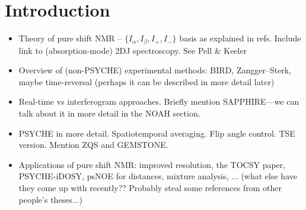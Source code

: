 \section{Introduction}
\label{sec:pureshift__introduction}

\begin{itemize}
    \item Theory of pure shift NMR -- $\{I_\alpha, I_\beta, I_+, I_-\}$ basis as explained in refs\autocite{Keeler2010,Thrippleton2005JMR,Griesinger1986JCP}.
        Include link to (absorption-mode) 2DJ spectroscopy.\autocite{Aue1976JCP} See Pell \& Keeler\autocite{Pell2007JMR}
    \item Overview of (non-PSYCHE) experimental methods: BIRD, Zangger--Sterk\autocite{Zangger1997JMR}, maybe time-reversal (perhaps it can be described in more detail later)
    \item Real-time vs interferogram approaches. Briefly mention SAPPHIRE\autocite{Moutzouri2017CC}---we can talk about it in more detail in the NOAH section.
    \item PSYCHE\autocite{Foroozandeh2014ACIE,Foroozandeh2018CEJ} in more detail.
        Spatiotemporal averaging.\autocite{Dumez2018PNMRS}
        Flip angle control.
        TSE version\autocite{Foroozandeh2015CC}.
        Mention ZQS\autocite{Thrippleton2003ACIE} and GEMSTONE\autocite{Kiraly2021ACIE}.
    \item Applications of pure shift NMR: improved resolution, the TOCSY paper\autocite{Foroozandeh2014JACS}, PSYCHE-iDOSY\autocite{Foroozandeh2016ACIE}, psNOE for distances\autocite{Kaltschnee2016JMR}, mixture analysis, ... (what else have they come up with recently?? Probably steal some references from other people's theses...)
\end{itemize}
